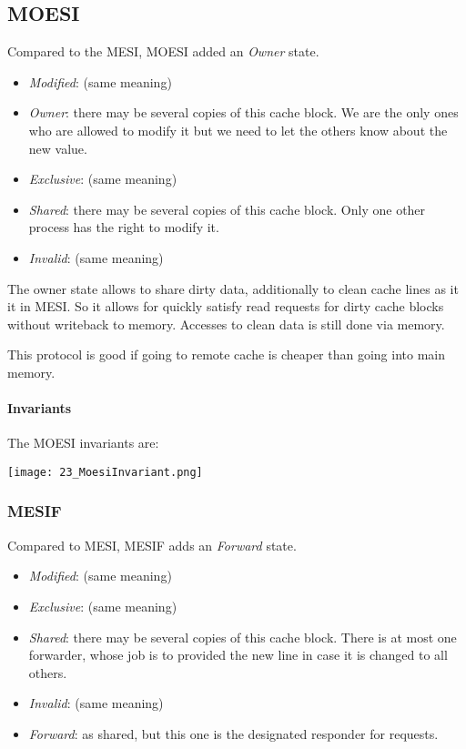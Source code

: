 

\subsection{MOESI}
Compared to the MESI, MOESI added an \textit{Owner} state. 

\begin{itemize}
    \item \textit{Modified}: (same meaning)
    \item \textit{Owner}: there may be several copies of this cache block. We are the only ones who are allowed to modify it but we need to let the others know about the new value.
    \item \textit{Exclusive}: (same meaning)
    \item \textit{Shared}: there may be several copies of this cache block. Only one other process has the right to modify it.
    \item \textit{Invalid}: (same meaning)
\end{itemize}

The owner state allows to share dirty data, additionally to clean cache lines as it it in MESI. So it allows for quickly satisfy read requests for dirty cache blocks without writeback to memory. Accesses to clean data is still done via memory.

This protocol is good if going to remote cache is cheaper than going into main memory.

\paragraph{Invariants}
The MOESI invariants are:

\texttt{[image: 23\_MoesiInvariant.png]}

\subsubsection{MESIF}
Compared to MESI, MESIF adds an \textit{Forward} state.

\begin{itemize}
    \item \textit{Modified}: (same meaning)
    \item \textit{Exclusive}: (same meaning)
    \item \textit{Shared}: there may be several copies of this cache block. There is at most one forwarder, whose job is to provided the new line in case it is changed to all others.
    \item \textit{Invalid}: (same meaning)
    \item \textit{Forward}: as shared, but this one is the designated responder for requests.
\end{itemize}

